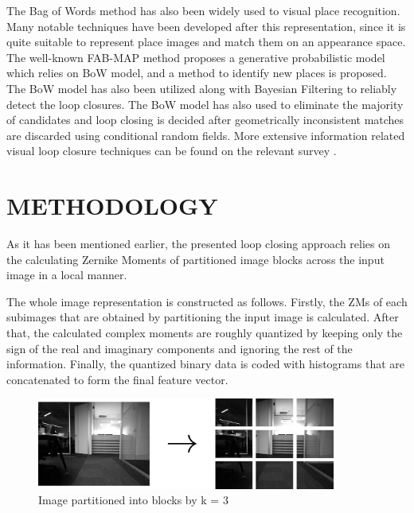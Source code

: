 \documentclass[]{spie}  %
\begin{document}
The Bag of Words\cite{1238663} method has also been widely used to visual place recognition. Many notable techniques have been developed after this representation, since it is quite suitable to represent place images and match them on an appearance space. The well-known FAB-MAP method proposes a generative probabilistic model\cite{CumminsNewmanIJRR08} which relies on BoW model, and a method to identify new places is proposed. The BoW model has also been utilized along with Bayesian Filtering\cite{4633680} to reliably detect the loop closures. The BoW model has also used to eliminate the majority of candidates\cite{5650234} and loop closing is decided after geometrically inconsistent matches are discarded using conditional random fields. More extensive information related visual loop closure techniques can be found on the relevant survey \cite{williams09}.


\section{METHODOLOGY}

As it has been mentioned earlier, the presented loop closing approach relies on the calculating Zernike Moments of partitioned image blocks across the input image in a local manner. 

The whole image representation is constructed as follows. Firstly, the ZMs of each subimages that are obtained by partitioning the input image is calculated. After that, the calculated complex moments are roughly quantized by keeping only the sign of the real and imaginary components and ignoring the rest of the information. Finally, the quantized binary data is coded with histograms that are concatenated to form the final feature vector.

\begin{figure}[!htb]
        \centering
        \includegraphics[trim = 0mm 0mm 0mm 0mm, clip, height=3cm]{figures/divided_image.png}    
        \vspace{3mm}
        \caption{Image partitioned into blocks by k = 3}
        \label{fig:divided_image}
\end{figure}
\end{document}
